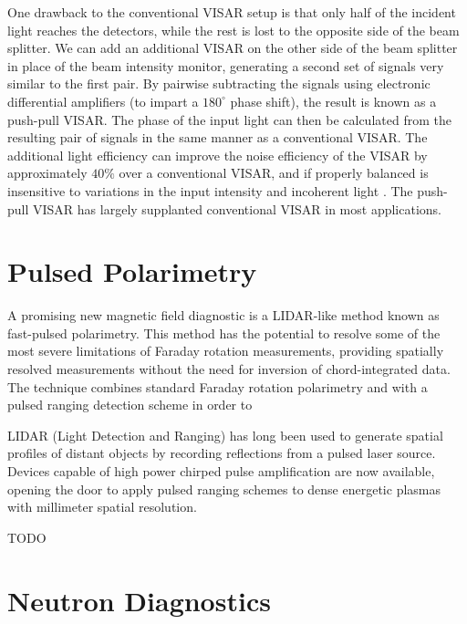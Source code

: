 \documentclass{jpp}
\begin{document}
One drawback to the conventional VISAR setup is that only half of the incident light reaches the detectors, while the rest is lost to the opposite side of the beam splitter. We can add an additional VISAR on the other side of the beam splitter in place of the beam intensity monitor, generating a second set of signals very similar to the first pair. By pairwise subtracting the signals using electronic differential amplifiers (to impart a $180^\circ$ phase shift), the result is known as a push-pull VISAR. The phase of the input light can then be calculated from the resulting pair of signals in the same manner as a conventional VISAR. The additional light efficiency can improve the noise efficiency of the VISAR by approximately $40\%$ over a conventional VISAR, and if properly balanced is insensitive to variations in the input intensity and incoherent light \citep{10.2172/886901}. The push-pull VISAR has largely supplanted conventional VISAR in most applications.

\section{Pulsed Polarimetry}

A promising new magnetic field diagnostic is a LIDAR-like method known as fast-pulsed polarimetry. This method has the potential to resolve some of the most severe limitations of Faraday rotation measurements, providing spatially resolved measurements without the need for inversion of chord-integrated data. The technique combines standard Faraday rotation polarimetry \citep{Pisarczyk1990} and  with a pulsed ranging detection scheme in order to 

LIDAR (Light Detection and Ranging) has long been used to generate spatial profiles of distant objects by recording reflections from a pulsed laser source. Devices capable of high power chirped pulse amplification \citep{STRICKLAND1985219} are now available, opening the door to apply pulsed ranging schemes to dense energetic plasmas with millimeter spatial resolution.

{\Large TODO \par}

\section{Neutron Diagnostics}
\end{document}
